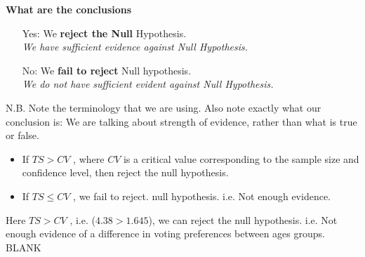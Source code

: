 \documentclass[a4paper,12pt]{article}
\begin{document}
\begin{framed}
\noindent \textbf{What are the conclusions}
	\begin{itemize} 
		
		\item[Yes:] We \textbf{reject the Null} Hypothesis. \\ \textit{We have sufficient evidence against Null Hypothesis.}
		
		\item[No:] We \textbf{fail to reject} Null hypothesis. \\ \textit{We do not have sufficient evident against Null Hypothesis.}
	\end{itemize}	
	{	\normalsize
		N.B. Note the terminology that we are using. Also note exactly what our conclusion is: We are talking about strength of evidence, rather than what is true or false.}
	
\end{framed}
	\smallskip
\begin{framed}
\begin{itemize}
	\item 	If $TS > CV$ , where $CV$ is a critical value corresponding to the sample size and confidence level, then reject the null hypothesis. 
	\item  If $TS \leq CV$ , we fail to reject. null hypothesis. i.e. Not enough evidence. 
	\end{itemize}	
\end{framed}	

\noindent Here $TS > CV$ , i.e. ($4.38 > 1.645$), we can reject the null hypothesis. i.e. Not enough evidence of a difference in voting preferences between ages groups. 
\newpage
BLANK
	
	
\end{document}
